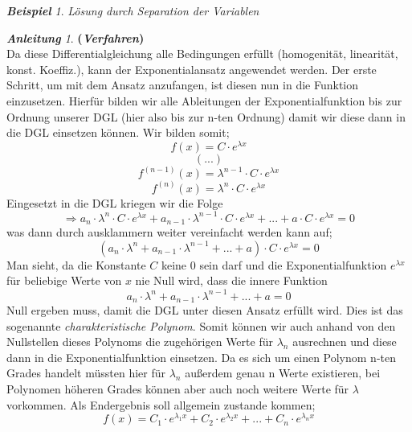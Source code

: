 \documentclass[a4paper,11pt]{article}
\theoremstyle{remark}
\newtheorem{example}{\textbf{Beispiel}}[section]
\newtheorem{guide}{\textbf{Anleitung}}[section]
\begin{document}
\begin{example}{\textit{Lösung durch Separation der Variablen}}
\begin{guide}{\textbf{(\textit{Verfahren})}}
\begin{equation}
\end{equation}
Da diese Differentialgleichung alle Bedingungen erfüllt (homogenität, linearität, konst. Koeffiz.), kann der Exponentialansatz angewendet werden. Der erste Schritt, um mit dem Ansatz anzufangen, ist diesen nun in die Funktion einzusetzen. Hierfür bilden wir alle Ableitungen der Exponentialfunktion bis zur Ordnung unserer DGL (hier also bis zur n-ten Ordnung) damit wir diese dann in die DGL einsetzen können. Wir bilden somit;
\begin{equation}
f(x)=C\cdot e^{\lambda x}
\end{equation}
\begin{equation}
(...)
\end{equation}
\begin{equation}
f^{(n-1)}(x)=\lambda^{n-1} \cdot C\cdot e^{\lambda x}
\end{equation}
\begin{equation}
f^{(n)}(x)=\lambda^n \cdot C\cdot e^{\lambda x}
\end{equation}
Eingesetzt in die DGL kriegen wir die Folge
\begin{equation}
\Rightarrow a_n \cdot \lambda^n \cdot C\cdot e^{\lambda x}+a_{n-1} \cdot \lambda^{n-1} \cdot C\cdot e^{\lambda x}+...+a\cdot C\cdot e^{\lambda x}=0
\end{equation}
was dann durch ausklammern weiter vereinfacht werden kann auf;
\begin{equation}
(a_n \cdot \lambda^n+a_{n-1} \cdot \lambda^{n-1}+...+a) \cdot C\cdot e^{\lambda x}=0
\end{equation}
Man sieht, da die Konstante $C$ keine $0$ sein darf und die Exponentialfunktion $e^{\lambda x}$ für beliebige Werte von $x$ nie Null wird, dass die innere Funktion
\begin{equation}
a_n \cdot \lambda^n+a_{n-1} \cdot \lambda^{n-1}+...+a=0
\end{equation}
Null ergeben muss, damit die DGL unter diesen Ansatz erfüllt wird. Dies ist das sogenannte \textit{charakteristische Polynom}. Somit können wir auch anhand von den Nullstellen dieses Polynoms die zugehörigen Werte für $\lambda_n$ ausrechnen und diese dann in die Exponentialfunktion einsetzen. Da es sich um einen Polynom n-ten Grades handelt müssten hier für $\lambda_n$ außerdem genau n Werte existieren, bei Polynomen höheren Grades können aber auch noch weitere Werte für $\lambda$ vorkommen. Als Endergebnis soll allgemein zustande kommen;
\begin{equation}
f(x)=C_1\cdot e^{\lambda_1 x}+C_2\cdot e^{\lambda_2 x}+...+C_n\cdot e^{\lambda_n x}

\end{equation}
\end{guide}
\end{example}
\end{document}
